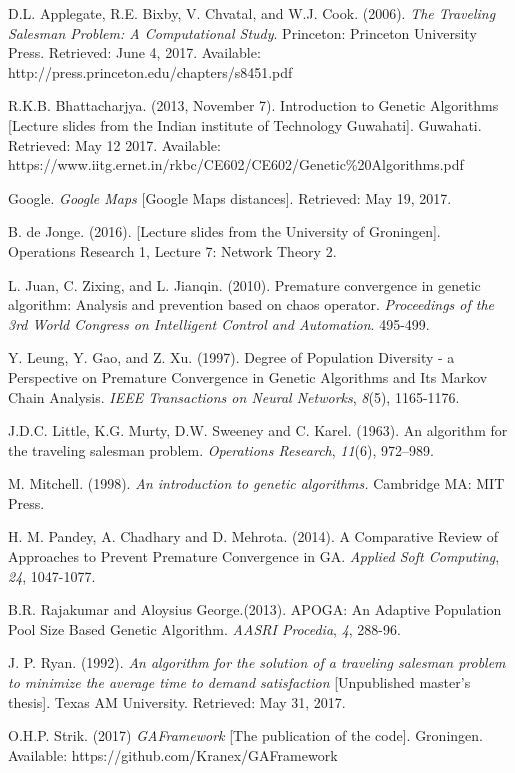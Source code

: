 \begin{thebibliography}{12}

D.L. Applegate, R.E. Bixby, V. Chvatal, and W.J. Cook. (2006). \textit{The Traveling Salesman Problem: A Computational Study}. Princeton: Princeton University Press. Retrieved: June 4, 2017.
Available: http://press.princeton.edu/chapters/s8451.pdf

R.K.B. Bhattacharjya. (2013, November 7).
Introduction to Genetic Algorithms [Lecture slides from the Indian institute of Technology Guwahati]. Guwahati. Retrieved: May 12 2017. Available: https://www.iitg.ernet.in/rkbc/CE602/CE602/Genetic\%20Algorithms.pdf

Google.
\textit{Google Maps} [Google Maps distances].
Retrieved: May 19, 2017.

 B. de Jonge. (2016). [Lecture slides from the University of Groningen]. Operations Research 1, Lecture 7: Network Theory 2. 

L. Juan, C. Zixing, and L. Jianqin.
(2010). Premature convergence in genetic algorithm: Analysis and prevention based on chaos operator.
\textit{Proceedings of the 3rd World Congress on Intelligent Control and Automation}. 495-499.

Y. Leung, Y. Gao, and Z. Xu. (1997).
Degree of Population Diversity - a Perspective on Premature Convergence in Genetic Algorithms and Its Markov Chain Analysis. \textit{IEEE Transactions on Neural Networks}, \textit{8}(5), 1165-1176. 

J.D.C. Little, K.G. Murty, D.W. Sweeney and C. Karel. (1963). An algorithm for the traveling salesman problem. \textit{Operations Research}, \textit{11}(6), 972–989.

M. Mitchell. (1998).
\textit{ An introduction to genetic algorithms.} Cambridge MA: MIT Press.

H. M. Pandey, A. Chadhary and D. Mehrota.
(2014). A Comparative Review of Approaches to Prevent Premature Convergence in GA. \textit{Applied Soft Computing}, \textit{24}, 1047-1077. 

B.R. Rajakumar and Aloysius George.(2013). APOGA: An Adaptive Population Pool Size Based Genetic Algorithm. \textit{AASRI Procedia}, \textit{4}, 288-96.

J. P. Ryan. (1992). 
\textit{An algorithm for the solution of a traveling salesman problem to minimize the average time to demand satisfaction} [Unpublished master's thesis]. Texas AM University. Retrieved: May 31, 2017.

O.H.P. Strik. (2017)
\textit{GAFramework} [The publication of the code]. 
Groningen. Available: https://github.com/Kranex/GAFramework

\end{thebibliography}


